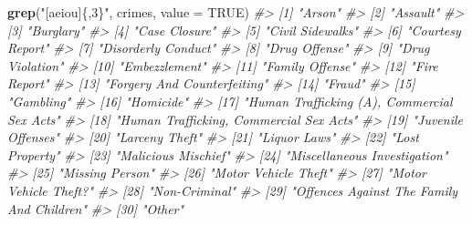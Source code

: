 \documentclass[
  12pt,
]{book}
\newenvironment{Shaded}{\begin{snugshade}}{\end{snugshade}}
\newcommand{\CommentTok}[1]{\textcolor[rgb]{0.37,0.37,0.37}{\textit{#1}}}
\newcommand{\DataTypeTok}[1]{\textcolor[rgb]{0.27,0.27,0.27}{#1}}
\newcommand{\KeywordTok}[1]{\textcolor[rgb]{0.27,0.27,0.27}{\textbf{#1}}}
\newcommand{\NormalTok}[1]{#1}
\newcommand{\OtherTok}[1]{\textcolor[rgb]{0.37,0.37,0.37}{#1}}
\newcommand{\StringTok}[1]{\textcolor[rgb]{0.5,0.5,0.5}{#1}}
\begin{document}
\begin{Shaded}
\begin{Highlighting}[]
\KeywordTok{grep}\NormalTok{(}\StringTok{"[aeiou]\{,3\}"}\NormalTok{, crimes, }\DataTypeTok{value =} \OtherTok{TRUE}\NormalTok{)}
\CommentTok{\#\textgreater{}  [1] "Arson"                                     }
\CommentTok{\#\textgreater{}  [2] "Assault"                                   }
\CommentTok{\#\textgreater{}  [3] "Burglary"                                  }
\CommentTok{\#\textgreater{}  [4] "Case Closure"                              }
\CommentTok{\#\textgreater{}  [5] "Civil Sidewalks"                           }
\CommentTok{\#\textgreater{}  [6] "Courtesy Report"                           }
\CommentTok{\#\textgreater{}  [7] "Disorderly Conduct"                        }
\CommentTok{\#\textgreater{}  [8] "Drug Offense"                              }
\CommentTok{\#\textgreater{}  [9] "Drug Violation"                            }
\CommentTok{\#\textgreater{} [10] "Embezzlement"                              }
\CommentTok{\#\textgreater{} [11] "Family Offense"                            }
\CommentTok{\#\textgreater{} [12] "Fire Report"                               }
\CommentTok{\#\textgreater{} [13] "Forgery And Counterfeiting"                }
\CommentTok{\#\textgreater{} [14] "Fraud"                                     }
\CommentTok{\#\textgreater{} [15] "Gambling"                                  }
\CommentTok{\#\textgreater{} [16] "Homicide"                                  }
\CommentTok{\#\textgreater{} [17] "Human Trafficking (A), Commercial Sex Acts"}
\CommentTok{\#\textgreater{} [18] "Human Trafficking, Commercial Sex Acts"    }
\CommentTok{\#\textgreater{} [19] "Juvenile Offenses"                         }
\CommentTok{\#\textgreater{} [20] "Larceny Theft"                             }
\CommentTok{\#\textgreater{} [21] "Liquor Laws"                               }
\CommentTok{\#\textgreater{} [22] "Lost Property"                             }
\CommentTok{\#\textgreater{} [23] "Malicious Mischief"                        }
\CommentTok{\#\textgreater{} [24] "Miscellaneous Investigation"               }
\CommentTok{\#\textgreater{} [25] "Missing Person"                            }
\CommentTok{\#\textgreater{} [26] "Motor Vehicle Theft"                       }
\CommentTok{\#\textgreater{} [27] "Motor Vehicle Theft?"                      }
\CommentTok{\#\textgreater{} [28] "Non{-}Criminal"                              }
\CommentTok{\#\textgreater{} [29] "Offences Against The Family And Children"  }
\CommentTok{\#\textgreater{} [30] "Other"                                     }

\end{Highlighting}
\end{Shaded}
\end{document}
